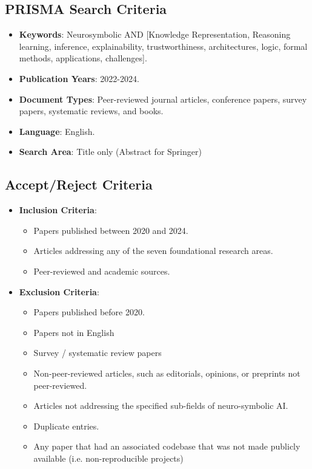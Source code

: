 \documentclass[journal]{IEEEtran}
\begin{document}
\subsection{PRISMA Search Criteria}
\begin{itemize}
    \item \textbf{Keywords}: Neurosymbolic AND [Knowledge Representation, Reasoning learning, inference, explainability, trustworthiness, architectures, logic, formal methods, applications, challenges].
    \item \textbf{Publication Years}: 2022-2024.
    \item \textbf{Document Types}: Peer-reviewed journal articles, conference papers, survey papers, systematic reviews, and books.
    \item \textbf{Language}: English.
    \item \textbf{Search Area}: Title only (Abstract for Springer)
\end{itemize}

\subsection{Accept/Reject Criteria}
\begin{itemize}
    \item \textbf{Inclusion Criteria}:
    \begin{itemize}
        \item Papers published between 2020 and 2024.
        \item Articles addressing any of the seven foundational research areas.
        \item Peer-reviewed and academic sources.
    \end{itemize}
    \item \textbf{Exclusion Criteria}:
    \begin{itemize}
        \item Papers published before 2020.
        \item Papers not in English
        \item Survey / systematic review papers 
        \item Non-peer-reviewed articles, such as editorials, opinions, or preprints not peer-reviewed.
        \item Articles not addressing the specified sub-fields of neuro-symbolic AI.
        \item Duplicate entries.
        \item Any paper that had an associated codebase that was not made publicly available (i.e. non-reproducible projects)
    \end{itemize}
\end{itemize}
\end{document}
